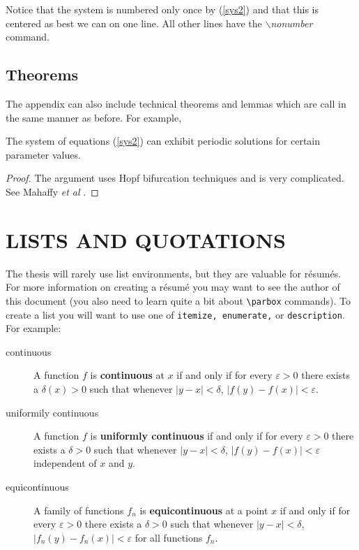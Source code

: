 Notice that the system is numbered only once by (\ref{sys2}) and that
this is centered as best we can on one line. All other lines have the
$\backslash$\textit{nonumber} command.

\section{Theorems}
The appendix can also include technical theorems and lemmas which are
call in the same manner as before. For example,
\begin{theorem}
  The system of equations \textrm{(\ref{sys2})} can exhibit periodic
  solutions for certain parameter values.
\end{theorem}

\noindent
\begin{proof}
  The argument uses Hopf bifurcation techniques and is
  very complicated. See Mahaffy \textit{et al} \cite{MJV}.
\end{proof}


\chapter{LISTS AND QUOTATIONS}

The thesis will rarely use list environments, but they are valuable
for r{\'e}sum{\'e}s. For more information on creating a r{\'e}sum{\'e}
you may want to see the author of this document (you also need to
learn quite a bit about \verb+\parbox+ commands).  To create a list
you will want to use one of \texttt{itemize, enumerate,} or
\texttt{description}. For example:
\begin{description}
\item[continuous] A function $f$ is {\bf continuous} at $x$ if and only
if for every $\varepsilon >0$ there exists a $\delta(x) >0$ such that
whenever $|y-x|<\delta$, $|f(y)-f(x)| < \varepsilon$.
\item[uniformily continuous] A function $f$ is {\bf uniformly
continuous} if and only if for every $\varepsilon >0$ there exists a
$\delta >0$ such that whenever $|y-x|<\delta$, $|f(y)-f(x)| <
\varepsilon$ independent of $x$ and $y$.
\item[equicontinuous] A family of functions $f_n$ is {\bf
equicontinuous} at a point $x$ if and only if for every $\varepsilon >0$
there exists a $\delta >0$ such that whenever $|y-x|<\delta$,
$|f_n(y)-f_n(x)| < \varepsilon$ for all functions $f_n$.
\end{description}

